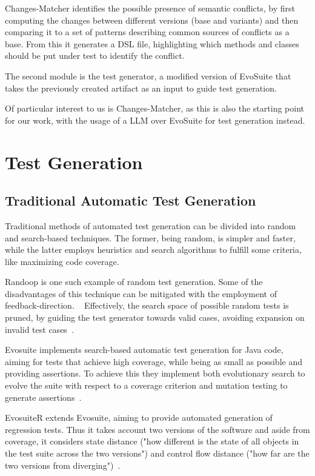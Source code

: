 Changes-Matcher identifies the possible presence of semantic conflicts, by first computing the changes between different versions (base and variants) and then comparing it to a set of patterns describing common sources of conflicts as a base. From this it generates a DSL file, highlighting which methods and classes should be put under test to identify the conflict.

The second module is the test generator, a modified version of EvoSuite that takes the previously created artifact as an input to guide test generation.

Of particular interest to us is Changes-Matcher, as this is also the starting point for our work, with the usage of a LLM over EvoSuite for test generation instead.

\section{Test Generation}

\subsection{Traditional Automatic Test Generation}

Traditional methods of automated test generation can be divided into random and search-based techniques. The former, being random, is simpler and faster, while the latter employs heuristics and search algorithms to fulfill some criteria, like maximizing code coverage.

Randoop is one such example of random test generation. Some of the disadvantages of this technique can be mitigated with the employment of feedback-direction. ~\citep{kn:randoop} Effectively, the search space of possible random tests is pruned, by guiding the test generator towards valid cases, avoiding expansion on invalid test cases~\citep{kn:randoop}.

Evosuite implements search-based automatic test generation for Java code, aiming for tests that achieve high coverage, while being as small as possible and providing assertions. To achieve this they implement both evolutionary search to evolve the suite with respect to a coverage criterion and mutation testing to generate assertions~\citep{kn:evosuite}.

EvosuiteR extends Evosuite, aiming to provide automated generation of regression tests. Thus it takes account two versions of the software and aside from coverage, it considers state distance ("how different is the state of
all objects in the test suite across the two versions") and control flow distance ("how
far are the two versions from diverging")~\citep{kn:evosuiter}.


